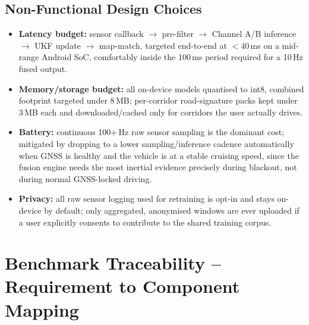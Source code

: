 \documentclass[10.5pt]{article}
\begin{document}
\subsection{Non-Functional Design Choices}
\begin{itemize}
\item \textbf{Latency budget:} sensor callback $\to$ pre-filter $\to$ Channel A/B inference $\to$ UKF update $\to$ map-match, targeted end-to-end at $<$40\,ms on a mid-range Android SoC, comfortably inside the 100\,ms period required for a 10\,Hz fused output.
\item \textbf{Memory/storage budget:} all on-device models quantised to int8, combined footprint targeted under 8\,MB; per-corridor road-signature packs kept under 3\,MB each and downloaded/cached only for corridors the user actually drives.
\item \textbf{Battery:} continuous 100+\,Hz raw sensor sampling is the dominant cost; mitigated by dropping to a lower sampling/inference cadence automatically when GNSS is healthy and the vehicle is at a stable cruising speed, since the fusion engine needs the most inertial evidence precisely during blackout, not during normal GNSS-locked driving.
\item \textbf{Privacy:} all raw sensor logging used for retraining is opt-in and stays on-device by default; only aggregated, anonymised windows are ever uploaded if a user explicitly consents to contribute to the shared training corpus.
\end{itemize}

\newpage
\section{Benchmark Traceability -- Requirement to Component Mapping}
\end{document}
